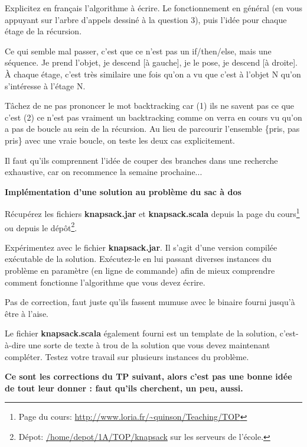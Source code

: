 \documentclass[10pt]{article}\usepackage[nu]{esial}
\begin{document}
\Question Explicitez en français l'algorithme à écrire. Le fonctionnement en
général (en vous appuyant sur l'arbre d'appels dessiné à la question 3), puis
l'idée pour chaque étage de la récursion.

\begin{Reponse}
  Ce qui semble mal passer, c'est que ce n'est pas un if/then/else, mais une
  séquence. Je prend l'objet, je descend [à gauche], je le pose, je descend [à
  droite]. À chaque étage, c'est très similaire une fois qu'on a vu que c'est
  à  l'objet N qu'on s'intéresse à l'étage N.

  Tâchez de ne pas prononcer le mot backtracking car (1) ils ne savent pas ce
  que c'est (2) ce n'est pas vraiment un backtracking comme on verra en cours vu
  qu'on a pas de boucle au sein de la récursion. Au lieu de parcourir l'ensemble
  \{pris, pas pris\} avec une vraie boucle, on teste les deux cas explicitement.

  Il faut qu'ils comprennent l'idée de couper des branches dans une recherche
  exhaustive, car on recommence la semaine prochaine...
\end{Reponse}

\Exercice\textbf{Implémentation d'une solution au problème du sac à dos}

Récupérez les fichiers \textbf{knapsack.jar} et \textbf{knapsack.scala} depuis
la page du cours\footnote{Page du cours:
  \url{http://www.loria.fr/~quinson/Teaching/TOP}} ou depuis le
dépôt\footnote{Dépot: \url{/home/depot/1A/TOP/knapsack} sur les serveurs de
  l'école.}.

\Question Expérimentez avec le fichier \textbf{knapsack.jar}. Il s'agit d'une
version compilée exécutable de la solution. Exécutez-le en lui passant diverses
instances du problème en paramètre (en ligne de commande) afin de mieux
comprendre comment fonctionne l'algorithme que vous devez écrire.

\begin{Reponse}
  Pas de correction, faut juste qu'ils fassent mumuse avec le binaire fourni
  jusqu'à être à l'aise.
\end{Reponse}

\Question Le fichier \textbf{knapsack.scala} également fourni est un template de
la solution, c'est-à-dire une sorte de texte à trou de la solution que vous
devez maintenant compléter. Testez votre travail sur plusieurs instances du problème.

\begin{Reponse}
  \noindent\textbf{Ce sont les corrections du TP suivant, alors c'est pas une
    bonne idée de tout leur donner : faut qu'ils cherchent, un peu,
    aussi.}
    
\end{Reponse}
\end{document}
